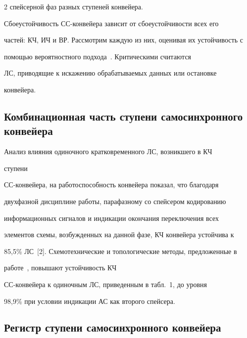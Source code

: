 \begin{multicols}{2}
спейсерной фаз разных ступеней конвейера.

  

  Сбоеустойчивость СС-конвейера зависит от сбоеустойчивости всех его 

частей: КЧ, ИЧ и ВР. Рассмотрим каждую из них, оценивая их устойчивость с 

помощью вероятностного подхода~\cite{2-step}. Критическими считаются 

ЛС, приводящие к искажению обрабатываемых данных или остановке 

конвейера.



\vspace*{-4pt}



\subsection{Комбинационная часть ступени самосинхронного конвейера}



  Анализ влияния одиночного кратковременного ЛС, возникшего в КЧ 

ступени 

  СС-кон\-вей\-ера, на работоспособность конвейера показал, что благодаря 

двухфазной дисциплине работы, парафазному со спейсером кодированию 

информационных сигналов и индикации окончания переключения всех 

элементов схемы, возбужденных на данной фазе, КЧ конвейера устойчива к 

85,5\% ЛС~[2]. Схемотехнические и топологические методы, предложенные в 

работе~\cite{2-step}, повышают устойчивость КЧ 

  СС-кон\-вей\-ера к одиночным ЛС, приведенным в табл.~1, до уровня 

98,9\% при условии индикации АС как второго спейсера. 



\vspace*{-4pt}

  

\subsection{Регистр ступени самосинхронного конвейера}

  


\end{multicols}
